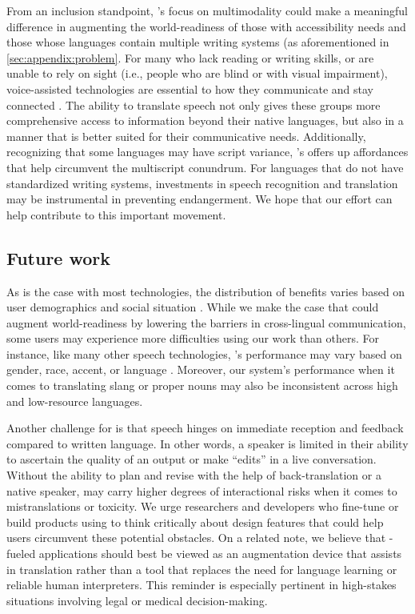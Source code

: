 From an inclusion standpoint, \mfourt’s focus on multimodality could make a meaningful difference in augmenting the world-readiness of those with accessibility needs and those whose languages contain multiple writing systems (as aforementioned in \ref{sec:appendix:problem}. For many who lack reading or writing skills, or are unable to rely on sight (i.e., people who are blind or with visual impairment), voice-assisted technologies are essential to how they communicate and stay connected \citep{belekar2020voice}. The ability to translate speech not only gives these groups more comprehensive access to information beyond their native languages, but also in a manner that is better suited for their communicative needs. Additionally, recognizing that some languages may have script variance, \mfourt’s offers up affordances that help circumvent the multiscript conundrum. For languages that do not have standardized writing systems, investments in speech recognition and translation may be instrumental in preventing endangerment. We hope that our effort can help contribute to this important movement.

\subsection{Future work}

As is the case with most technologies, the distribution of benefits varies based on user demographics and social situation \citep{wang2023human}. While we make the case that \mfourt could augment world-readiness by lowering the barriers in cross-lingual communication, some users may experience more difficulties using our work than others. For instance, like many other speech technologies, \mfourt’s \asr{} performance may vary based on gender, race, accent, or language \citep{koenecke2020racial,ngueajio2022hey}. Moreover, our system's performance when it comes to translating slang or proper nouns may also be inconsistent across high and low-resource languages. 

Another challenge for \sst{} is that speech hinges on immediate reception and feedback compared to written language. In other words, a speaker is limited in their ability to ascertain the quality of an output or make “edits” in a live conversation. Without the ability to plan and revise with the help of back-translation or a native speaker, \sst{} may carry higher degrees of interactional risks when it comes to mistranslations or toxicity. We urge researchers and developers who fine-tune or build products using \mfourt to think critically about design features that could help users circumvent these potential obstacles. On a related note, we believe that \mfourt-fueled applications should best be viewed as an augmentation device that assists in translation rather than a tool that replaces the need for language learning or reliable human interpreters. This reminder is especially pertinent in high-stakes situations involving legal or medical decision-making.

